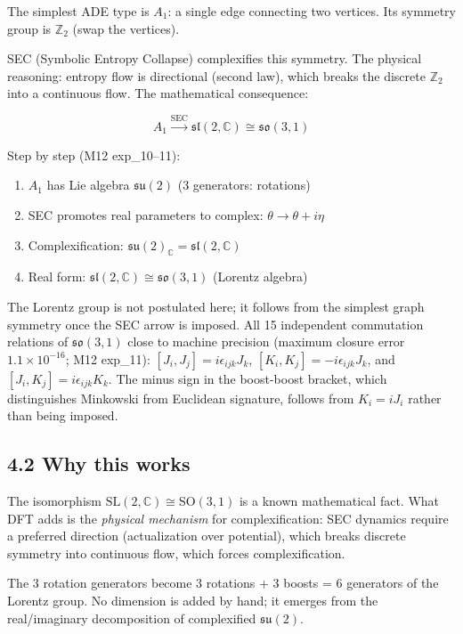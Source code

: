 \documentclass[11pt,a4paper]{article}
\providecommand{\tightlist}{\setlength{\itemsep}{0pt}\setlength{\parskip}{0pt}}
\begin{document}
The simplest ADE type is $A_1$: a single edge connecting two vertices. Its symmetry group is $\mathbb{Z}_2$ (swap the vertices).

SEC (Symbolic Entropy Collapse) complexifies this symmetry. The physical reasoning: entropy flow is directional (second law), which breaks the discrete $\mathbb{Z}_2$ into a continuous flow. The mathematical consequence:

\[A_1 \xrightarrow{\text{SEC}} \mathfrak{sl}(2, \mathbb{C}) \cong \mathfrak{so}(3,1)\]

Step by step (M12 exp\_10–11):
\begin{enumerate}\tightlist
\item $A_1$ has Lie algebra $\mathfrak{su}(2)$ (3 generators: rotations)
\item SEC promotes real parameters to complex: $\theta \to \theta + i\eta$
\item Complexification: $\mathfrak{su}(2)_\mathbb{C} = \mathfrak{sl}(2, \mathbb{C})$
\item Real form: $\mathfrak{sl}(2, \mathbb{C}) \cong \mathfrak{so}(3,1)$ (Lorentz algebra)
\end{enumerate}

The Lorentz group is not postulated here; it follows from the simplest graph symmetry once the SEC arrow is imposed. All 15 independent commutation relations of $\mathfrak{so}(3,1)$ close to machine precision (maximum closure error $1.1\times10^{-16}$; M12 exp\_11): $[J_i,J_j]=i\epsilon_{ijk}J_k$, $[K_i,K_j]=-i\epsilon_{ijk}J_k$, and $[J_i,K_j]=i\epsilon_{ijk}K_k$. The minus sign in the boost-boost bracket, which distinguishes Minkowski from Euclidean signature, follows from $K_i=iJ_i$ rather than being imposed.

\subsection*{4.2 Why this works}

The isomorphism $\text{SL}(2, \mathbb{C}) \cong \text{SO}(3,1)$ is a known mathematical fact. What DFT adds is the \emph{physical mechanism} for complexification: SEC dynamics require a preferred direction (actualization over potential), which breaks discrete symmetry into continuous flow, which forces complexification.

The 3 rotation generators become 3 rotations + 3 boosts = 6 generators of the Lorentz group. No dimension is added by hand; it emerges from the real/imaginary decomposition of complexified $\mathfrak{su}(2)$.
\end{document}
